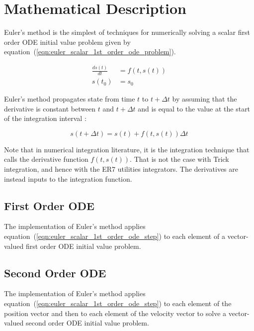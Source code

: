 \section{Mathematical Description}

Euler's method is the simplest of techniques for numerically
solving a scalar first order ODE initial value problem given
by equation~(\ref{eqn:euler_scalar_1st_order_ode_problem}).

\begin{equation}
\label{eqn:euler_scalar_1st_order_ode_problem}
\begin{split}
\frac{d s(t)}{dt} &= f(t, s(t)) \\
s(t_0) &= s_0
\end{split}
\end{equation}

Euler's method propagates state from time $t$ to $t+\Delta t$
by assuming that the derivative is constant between $t$ and $t+\Delta t$
and is equal to the value at the start of the integration interval
\cite{butcher:2008}:

\begin{equation}
\label{eqn:euler_scalar_1st_order_ode_step}
s(t+\Delta t) = s(t) + f(t, s(t)) \Delta t
\end{equation}

Note that in numerical integration literature, it is the integration technique
that calls the derivative function $f(t, s(t))$. That is not the case
with Trick integration, and hence with the ER7 utilities integrators.
The derivatives are instead inputs to the integration function.

\subsection{First Order ODE}

The \erseven implementation of Euler's method applies
equation~(\ref{eqn:euler_scalar_1st_order_ode_step})
to each element of a vector-valued first order ODE initial value problem.

\subsection{Second Order ODE}

The \erseven implementation of Euler's method applies
equation~(\ref{eqn:euler_scalar_1st_order_ode_step})
to each element of the position vector and then
to each element of the velocity vector to solve a
vector-valued second order ODE initial value problem.

